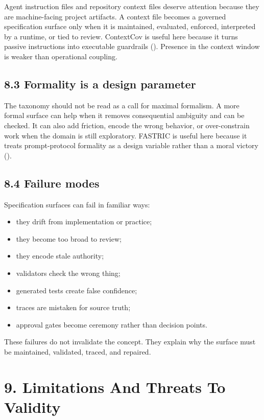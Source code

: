 \documentclass[
]{article}
\providecommand{\tightlist}{%
  \setlength{\itemsep}{0pt}\setlength{\parskip}{0pt}}
\begin{document}
Agent instruction files and repository context files deserve attention
because they are machine-facing project artifacts. A context file
becomes a governed specification surface only when it is maintained,
evaluated, enforced, interpreted by a runtime, or tied to review.
ContextCov is useful here because it turns passive instructions into
executable guardrails (). Presence in the context window is weaker than operational
coupling.

\subsection{8.3 Formality is a design
parameter}\label{formality-is-a-design-parameter}

The taxonomy should not be read as a call for maximal formalism. A more
formal surface can help when it removes consequential ambiguity and can
be checked. It can also add friction, encode the wrong behavior, or
over-constrain work when the domain is still exploratory. FASTRIC is
useful here because it treats prompt-protocol formality as a design
variable rather than a moral victory ().

\subsection{8.4 Failure modes}\label{failure-modes}

Specification surfaces can fail in familiar ways:

\begin{itemize}
\tightlist
\item
  they drift from implementation or practice;
\item
  they become too broad to review;
\item
  they encode stale authority;
\item
  validators check the wrong thing;
\item
  generated tests create false confidence;
\item
  traces are mistaken for source truth;
\item
  approval gates become ceremony rather than decision points.
\end{itemize}

These failures do not invalidate the concept. They explain why the
surface must be maintained, validated, traced, and repaired.

\section{9. Limitations And Threats To
Validity}\label{limitations-and-threats-to-validity}
\end{document}
